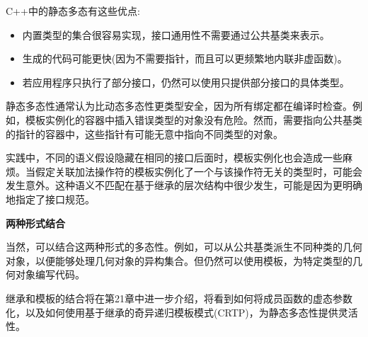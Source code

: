 C++中的静态多态有这些优点:

\begin{itemize}
\item 
内置类型的集合很容易实现，接口通用性不需要通过公共基类来表示。

\item 
生成的代码可能更快(因为不需要指针，而且可以更频繁地内联非虚函数)。

\item 
若应用程序只执行了部分接口，仍然可以使用只提供部分接口的具体类型。
\end{itemize}

静态多态性通常认为比动态多态性更类型安全，因为所有绑定都在编译时检查。例如，模板实例化的容器中插入错误类型的对象没有危险。然而，需要指向公共基类的指针的容器中，这些指针有可能无意中指向不同类型的对象。

实践中，不同的语义假设隐藏在相同的接口后面时，模板实例化也会造成一些麻烦。当假定关联加法操作符的模板实例化了一个与该操作符无关的类型时，可能会发生意外。这种语义不匹配在基于继承的层次结构中很少发生，可能是因为更明确地指定了接口规范。

\noindent
\textbf{两种形式结合}

当然，可以结合这两种形式的多态性。例如，可以从公共基类派生不同种类的几何对象，以便能够处理几何对象的异构集合。但仍然可以使用模板，为特定类型的几何对象编写代码。

继承和模板的结合将在第21章中进一步介绍，将看到如何将成员函数的虚态参数化，以及如何使用基于继承的奇异递归模板模式(CRTP)，为静态多态性提供灵活性。




























